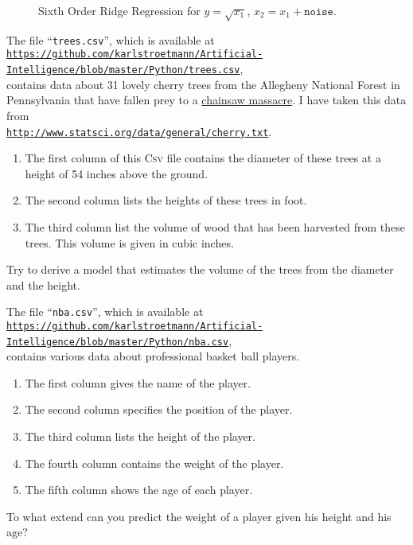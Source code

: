 \begin{figure}[!th]
\caption{Sixth Order Ridge Regression for $y = \sqrt{x_1}$, $x_2 = x_1 + \mathtt{noise}$.}
\label{fig:sqrt-6ridge.pdf}
\end{figure}




\exercise
The file ``\texttt{trees.csv}'', which is available at
\\[0.2cm]
\hspace*{0.3cm}
\href{https://github.com/karlstroetmann/Artificial-Intelligence/blob/master/Python/trees.csv}{\texttt{https://github.com/karlstroetmann/Artificial-Intelligence/blob/master/Python/trees.csv}},
\\[0.2cm]
contains data about 31 lovely cherry trees from the Allegheny National Forest in Pennsylvania that have fallen
prey to a \href{https://en.wikipedia.org/wiki/The_Texas_Chain_Saw_Massacre}{chainsaw massacre}.  I have taken this data from
\\[0.2cm]
\hspace*{1.3cm}
\href{http://www.statsci.org/data/general/cherry.txt}{\texttt{http://www.statsci.org/data/general/cherry.txt}}.
\begin{enumerate}
\item The first column of this \textsc{Csv} file contains the diameter of these trees at a height of 54 inches above
      the ground.
\item The second column lists the heights of these trees in foot.
\item The third column list the volume of wood that has been harvested from these trees.  This volume is given
      in cubic inches.
\end{enumerate}
Try to derive a model that estimates the volume of the trees from the diameter and the height.
\eox


\exercise
The file ``\texttt{nba.csv}'', which is available at
\\[0.2cm]
\hspace*{0.3cm}
\href{https://github.com/karlstroetmann/Artificial-Intelligence/blob/master/Python/nba.csv}{\texttt{https://github.com/karlstroetmann/Artificial-Intelligence/blob/master/Python/nba.csv}},
\\[0.2cm]
contains various data about professional basket ball players.
\begin{enumerate}
\item The first column gives the name of the player.
\item The second column specifies the position of the player.
\item The third column lists the height of the player.
\item The fourth column contains the weight of the player.
\item The fifth column shows the age of each player.
\end{enumerate}
To what extend can you predict the weight of a player given his height and his age?
\eox



